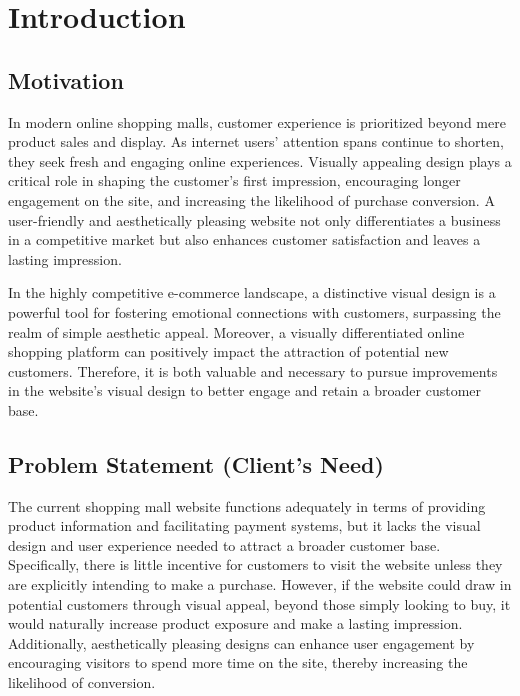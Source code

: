 \documentclass[conference]{IEEEtran}
\begin{document}
\section{Introduction}

\subsection{Motivation}

In modern online shopping malls, customer experience is prioritized beyond mere product sales and display. As internet users' attention spans continue to shorten, they seek fresh and engaging online experiences. Visually appealing design plays a critical role in shaping the customer's first impression, encouraging longer engagement on the site, and increasing the likelihood of purchase conversion. A user-friendly and aesthetically pleasing website not only differentiates a business in a competitive market but also enhances customer satisfaction and leaves a lasting impression.

In the highly competitive e-commerce landscape, a distinctive visual design is a powerful tool for fostering emotional connections with customers, surpassing the realm of simple aesthetic appeal. Moreover, a visually differentiated online shopping platform can positively impact the attraction of potential new customers. Therefore, it is both valuable and necessary to pursue improvements in the website's visual design to better engage and retain a broader customer base.

\subsection{Problem Statement (Client's Need)}

The current shopping mall website functions adequately in terms of providing product information and facilitating payment systems, but it lacks the visual design and user experience needed to attract a broader customer base. Specifically, there is little incentive for customers to visit the website unless they are explicitly intending to make a purchase. However, if the website could draw in potential
customers through visual appeal, beyond those simply looking to buy, it would naturally increase product exposure and make a lasting impression. Additionally, aesthetically pleasing designs can enhance user engagement by encouraging visitors to spend more time on the site, thereby increasing the
likelihood of conversion.
\end{document}

